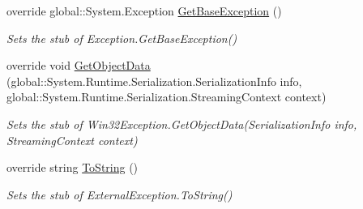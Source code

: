 \begin{DoxyCompactItemize}
override global\-::\-System.\-Exception \hyperlink{class_system_1_1_net_1_1_sockets_1_1_fakes_1_1_stub_socket_exception_ae2da7dfad9de904ccc2d5d563f531d01}{Get\-Base\-Exception} ()
\begin{DoxyCompactList}\small\item\em Sets the stub of Exception.\-Get\-Base\-Exception()\end{DoxyCompactList}\item 
override void \hyperlink{class_system_1_1_net_1_1_sockets_1_1_fakes_1_1_stub_socket_exception_a75f609cbf69019e225538c812996e409}{Get\-Object\-Data} (global\-::\-System.\-Runtime.\-Serialization.\-Serialization\-Info info, global\-::\-System.\-Runtime.\-Serialization.\-Streaming\-Context context)
\begin{DoxyCompactList}\small\item\em Sets the stub of Win32\-Exception.\-Get\-Object\-Data(\-Serialization\-Info info, Streaming\-Context context)\end{DoxyCompactList}\item 
override string \hyperlink{class_system_1_1_net_1_1_sockets_1_1_fakes_1_1_stub_socket_exception_a3d944b4cc103a119300a34099ed9c0aa}{To\-String} ()
\begin{DoxyCompactList}\small\item\em Sets the stub of External\-Exception.\-To\-String()\end{DoxyCompactList}\end{DoxyCompactItemize}

